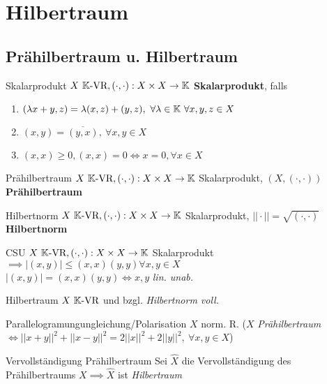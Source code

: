 \section{Hilbertraum}

\subsection{Prähilbertraum u. Hilbertraum}

\begin{definition}{Skalarprodukt}
  $X \ \mathbb{K} \text{-VR}, (\cdot,\cdot):X \times X \to \mathbb{K}$ \textbf{Skalarprodukt}, falls
  \begin{enumerate}[label=(\roman*)]
    \item $(\lambda x +y,z) = \lambda (x,z) + (y,z),\ \forall \lambda \in \mathbb{K}\
      \forall x,y,z \in X$
    \item $(x,y) = \overline{(y,x)},\ \forall x,y \in X $
    \item $(x,x) \geq 0, (x,x) = 0 \Leftrightarrow x = 0, \forall x\in X$
  \end{enumerate}
\end{definition}

\begin{definition}{Prähilbertraum}
  $X \ \mathbb{K} \text{-VR}, (\cdot,\cdot):X \times X \to \mathbb{K}$ Skalarprodukt, $(X,(\cdot,\cdot))$
  \textbf{Prähilbertraum}
\end{definition}

\begin{definition}{Hilbertnorm}
  $X \ \mathbb{K} \text{-VR}, (\cdot,\cdot):X \times X \to \mathbb{K}$ Skalarprodukt, $||\cdot|| =
  \sqrt{(\cdot,\cdot)}$ \textbf{Hilbertnorm}
\end{definition}

\begin{satz}{CSU}
  $X \ \mathbb{K} \text{-VR}, (\cdot,\cdot):X \times X \to \mathbb{K}$ Skalarprodukt
  $\implies |(x,y)| \leq (x,x)(y,y) \forall x,y\in X $\\
  $|(x,y)| = (x,x)(y,y) \Leftrightarrow x,y$ \textit{lin. unab.}
\end{satz}

\begin{definition}{Hilbertraum}
  $X \ \mathbb{K} \text{-VR}$ und bzgl. \textit{Hilbertnorm voll.}
\end{definition}

\begin{satz}{Parallelogramungungleichung/Polarisation}
  $X$ norm. R. ($X$ \textit{Prähilbertraum} $\Leftrightarrow
  ||x+y||^2 + ||x-y||^2 = 2||x||^2 + 2||y||^2,\ \forall x,y\in X$)
\end{satz}

\begin{satz}{Vervollständigung Prähilbertraum}
  Sei $\hat{X}$ die Vervollständigung des Prähilbertraums $X \implies \hat{X}$
  ist \textit{Hilbertraum}
\end{satz}
